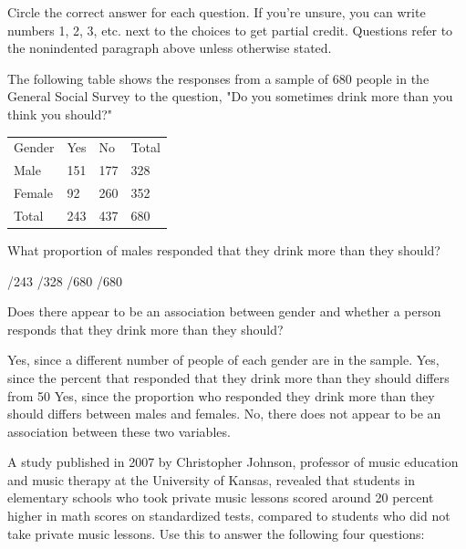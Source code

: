 \documentclass{article}
\begin{document}
	Circle the correct answer for each question.  If you're unsure, you can write numbers 1, 2, 3, etc. next to the choices to get partial credit.  Questions refer to the nonindented paragraph above unless otherwise stated.\\[.5cm]
	
	\begin{mcquestions}
		
		\begin{mcquestioninstruction}
			The following table shows the responses from a sample of 680 people in the General Social Survey to the question, "Do you sometimes drink more than you think you should?"\\
			
			\begin{tabular}{llll}
				Gender & Yes                     & No  & Total  \\
				Male   & 151                     & 177 & 328    \\
				Female & 92                      & 260 & 352    \\
				Total  & 243                     & 437 & 680   
			\end{tabular}
		\end{mcquestioninstruction}
		\question What proportion of males responded that they drink more than they should?
		\begin{mcanswerslist}
			/243
			/328
			/680
			/680
		\end{mcanswerslist}
		
		\question[follow] Does there appear to be an association between gender and whether a person responds that they drink more than they should?
		\begin{mcanswerslist}
			\answer Yes, since a different number of people of each gender are in the sample.
			\answer Yes, since the percent that responded that they drink more than they should differs from 50%
			\answer[correct] Yes, since the proportion who responded they drink more than they should differs between males and females.
			\answer No, there does not appear to be an association between these two variables.
		\end{mcanswerslist}
		
		\begin{mcquestioninstruction}
			A study published in 2007 by Christopher Johnson, professor of music education and music therapy at the University of Kansas, revealed that students in elementary schools who took private music lessons scored around 20 percent higher in math scores on standardized tests, compared to students who did not take private music lessons.  Use this to answer the following four questions:
		\end{mcquestioninstruction}
		

\end{mcquestions}
\end{document}
